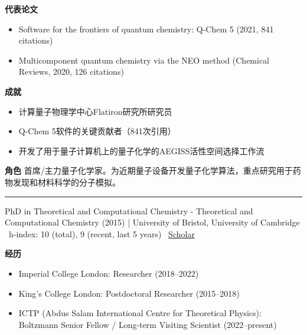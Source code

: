 \par{\footnotesize\color{mainred}\textbf{代表论文}}
\begin{itemize}[leftmargin=1.2em,itemsep=0pt,topsep=0pt]
\item {\footnotesize Software for the frontiers of quantum chemistry: Q-Chem 5 (2021, 841 citations)}
\item {\footnotesize Multicomponent quantum chemistry via the NEO method (Chemical Reviews, 2020, 126 citations)}
\end{itemize}
\par{\footnotesize\color{mainred}\textbf{成就}}
\begin{itemize}[leftmargin=1.2em,itemsep=0pt,topsep=0pt]
\item {\footnotesize 计算量子物理学中心Flatiron研究所研究员}
\item {\footnotesize Q-Chem 5软件的关键贡献者（841次引用）}
\item {\footnotesize 开发了用于量子计算机上的量子化学的AEGISS活性空间选择工作流}
\end{itemize}
\par{\footnotesize\color{mainred}\textbf{角色}} {\footnotesize 首席/主力量子化学家。为近期量子设备开发量子化学算法，重点研究用于药物发现和材料科学的分子模拟。}
\vspace{2pt}\hrule\vspace{2pt}
\vspace{4pt}
\par{\footnotesize\color{graytext}PhD in Theoretical and Computational Chemistry - Theoretical and Computational Chemistry (2015) | University of Bristol, University of Cambridge \textbar\  h-index: 10 (total), 9 (recent, last 5 years) \textbar\  \href{Not publicly indexed; profile exists per AD Scientific Index}{Scholar}}
\par{\footnotesize\color{mainred}\textbf{经历}}
\begin{itemize}[leftmargin=1.2em,itemsep=0pt,topsep=0pt]
\item {\footnotesize Imperial College London: Researcher (2018–2022)}
\item {\footnotesize King's College London: Postdoctoral Researcher (2015–2018)}
\item {\footnotesize ICTP (Abdus Salam International Centre for Theoretical Physics): Boltzmann Senior Fellow / Long-term Visiting Scientist (2022–present)}
\end{itemize}
